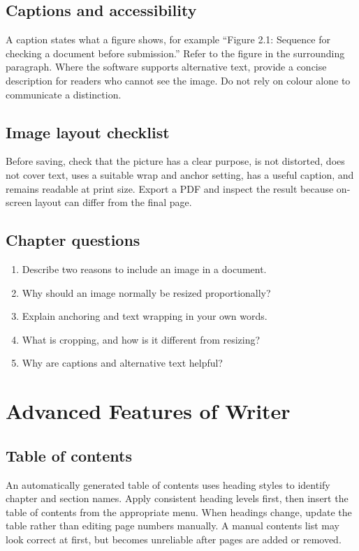 \documentclass[11pt,openany,oneside]{book}
\begin{document}
\section{Captions and accessibility}
A caption states what a figure shows, for example “Figure 2.1: Sequence for checking a document before submission.” Refer to the figure in the surrounding paragraph. Where the software supports alternative text, provide a concise description for readers who cannot see the image. Do not rely on colour alone to communicate a distinction.
\section{Image layout checklist}
Before saving, check that the picture has a clear purpose, is not distorted, does not cover text, uses a suitable wrap and anchor setting, has a useful caption, and remains readable at print size. Export a PDF and inspect the result because on-screen layout can differ from the final page.
\section{Chapter questions}
\begin{enumerate}\item Describe two reasons to include an image in a document.\item Why should an image normally be resized proportionally?\item Explain anchoring and text wrapping in your own words.\item What is cropping, and how is it different from resizing?\item Why are captions and alternative text helpful?\end{enumerate}

\chapter{Advanced Features of Writer}
\section{Table of contents}
An automatically generated table of contents uses heading styles to identify chapter and section names. Apply consistent heading levels first, then insert the table of contents from the appropriate menu. When headings change, update the table rather than editing page numbers manually. A manual contents list may look correct at first, but becomes unreliable after pages are added or removed.
\end{document}
